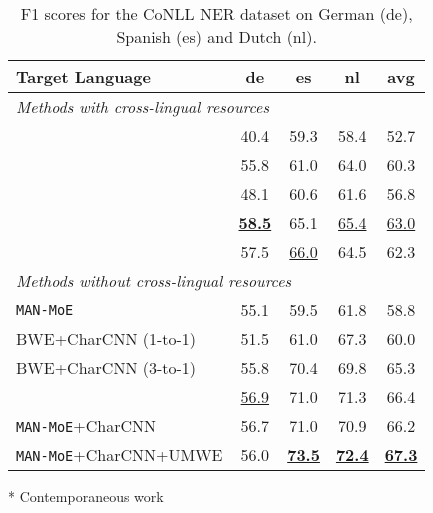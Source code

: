 \documentclass[11pt,a4paper]{article}
\newcommand{\manmoe}{\texttt{MAN-MoE}}
\begin{document}
\begin{table}
\begin{threeparttable}
    \centering
    \small
    \begin{tabular}{@{\hspace{0.4em}}l@{\hspace{0.4em}}@{\hspace{0.4em}}c@{\hspace{0.4em}}@{\hspace{0.4em}}c@{\hspace{0.4em}}@{\hspace{0.4em}}c@{\hspace{0.4em}}@{\hspace{0.4em}}c@{\hspace{0.4em}}}
        \toprule
        Target Language &   de  &   es & nl & avg \\
        \midrule
        \multicolumn{5}{l}{\emph{Methods with cross-lingual resources}}\\
        \citet{N12-1052} & 40.4 & 59.3 & 58.4 & 52.7 \\
        \citet{Nothman:2013:LMN:2405838.2405915} & 55.8 & 61.0 & 64.0 & 60.3 \\
        \citet{K16-1022} & 48.1 & 60.6 & 61.6 & 56.8 \\
        \citet{P17-1135} & \bf \underline{58.5} & 65.1 & \underline{65.4} & \underline{63.0} \\
        \citet{D17-1269} & 57.5 & \underline{66.0} & 64.5 & 62.3 \\
        \midrule
        \multicolumn{5}{l}{\emph{Methods without cross-lingual resources}}\\
        \manmoe{} & 55.1 & 59.5 & 61.8 & 58.8 \\
        BWE+CharCNN (1-to-1) & 51.5 & 61.0 & 67.3 & 60.0 \\
        BWE+CharCNN (3-to-1) & 55.8 & 70.4 & 69.8 & 65.3 \\
        \citet{D18-1034}\tnote{*} & \underline{56.9} & 71.0 & 71.3 & 66.4 \\
        \manmoe{}+CharCNN & 56.7 & 71.0 & 70.9 & 66.2 \\
        \manmoe{}+CharCNN+UMWE & 56.0 & \bf \underline{73.5} & \bf \underline{72.4} & \bf \underline{67.3} \\
        \bottomrule
    \end{tabular}
    \begin{tablenotes}
    \noindent\item[*] Contemporaneous work
    \end{tablenotes}
    \caption{F1 scores for the CoNLL NER dataset on German (de), Spanish (es) and Dutch (nl).}
    \label{tab:ner_results}
    \vspace{-3mm}
\end{threeparttable}
\end{table} 
\end{document}
